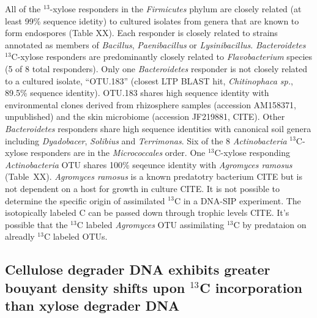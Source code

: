 All of the $^{13}$-xylose responders in the \textit{Firmicutes} phylum are closely related
(at least 99\% sequence idetity) to cultured isolates from genera that are known to form 
endospores (Table XX). Each responder is closely related to strains annotated
as members of \textit{Bacillus}, \textit{Paenibacillus} or
\textit{Lysinibacillus}. \textit{Bacteroidetes} $^{13}$C-xylose responders are
predominantly closely related to \textit{Flavobacterium} species (5 of 8 total
responders). Only one \textit{Bacteroidetes} responder is not closely related
to a cultured isolate, ``OTU.183'' (closest LTP BLAST hit, \textit{Chitinophaca
sp.}, 89.5\% sequence identity). OTU.183 shares high sequence identity with
environmental clones derived from rhizosphere samples (accession AM158371,
unpublished) and the skin microbiome (accession JF219881, CITE). Other
\textit{Bacteroidetes} responders share high sequence identities with canonical
soil genera including \textit{Dyadobacer}, \textit{Solibius} and
\textit{Terrimonas}. Six of the 8 \textit{Actinobacteria} $^{13}$C-xylose responders
are in the \textit{Micrococcales} order. One $^{13}$C-xylose responding \textit{Actinobacteria}
OTU shares 100\% seqeunce identity with \textit{Agromyces ramosus} (Table~XX). 
\textit{Agromyces ramosus} is a known predatotry bacterium CITE but is not dependent
on a host for growth in culture CITE. It is not possible to determine the specific origin
of assimilated $^{13}$C in a DNA-SIP experiment. The isotopically labeled C can be passed 
down through trophic levels CITE. It's possible that the $^{13}$C labeled \textit{Agromyces} 
OTU assimilating $^{13}$C by predataion on alreadly $^{13}$C labeled OTUs.

\subsection{Cellulose degrader DNA exhibits greater bouyant density shifts upon
$^{13}$C incorporation than xylose degrader DNA} 

